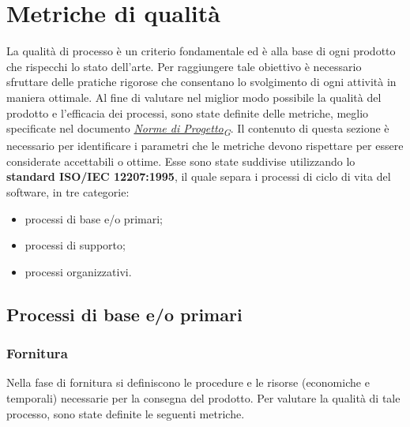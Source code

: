 \section{Metriche di qualità}
La qualità di processo è un criterio fondamentale ed è alla base di ogni prodotto che rispecchi lo stato dell'arte. Per raggiungere tale obiettivo è necessario sfruttare delle pratiche rigorose che consentano lo svolgimento di ogni attività in maniera ottimale. Al fine di valutare nel miglior modo possibile la qualità del prodotto e l'efficacia dei processi, sono state definite delle metriche, meglio specificate nel documento \href{https://7last.github.io/docs/rtb/documentazione-interna/glossario#norme-di-progetto}{\textit{Norme di Progetto\textsubscript{G}}}. Il contenuto di questa sezione è necessario per identificare i parametri che le metriche devono rispettare per essere considerate accettabili o ottime. Esse sono state suddivise utilizzando lo \textbf{standard ISO/IEC 12207:1995}, il quale separa i processi di ciclo di vita del software, in tre categorie: %
\begin{itemize}
	\item processi di base e/o primari;
	\item processi di supporto;
	\item processi organizzativi.
\end{itemize}



\subsection{Processi di base e/o primari}

\subsubsection{Fornitura}
Nella fase di fornitura si definiscono le procedure e le risorse (economiche e temporali) necessarie per la consegna del prodotto. Per valutare la qualità di tale processo, sono state definite le seguenti metriche.

